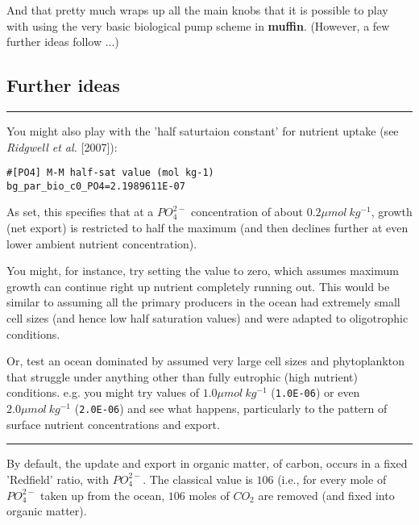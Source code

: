 \documentclass[11pt,fleqn]{book} %
\begin{document}
\vspace{1mm}
And that pretty much wraps up all the main knobs that it is possible to play with using the very basic biological pump scheme in \textbf{muffin}. (However, a few further ideas follow ...)


\subsection{Further ideas}

\vspace{1mm}
\noindent\rule{4cm}{0.5pt}
\vspace{2mm}

\noindent You might also play with the 'half saturtaion constant' for nutrient uptake (see \textit{Ridgwell et al.} [2007]):
\vspace{-1mm}\small\begin{verbatim}
#[PO4] M-M half-sat value (mol kg-1)
bg_par_bio_c0_PO4=2.1989611E-07
\end{verbatim}\normalsize\vspace{-1mm}
As set, this specifies that at a \(PO^{2-}_{4}\) concentration of about \(0.2 \mu mol \:kg^{-1} \), growth (net export) is restricted to half the maximum (and then declines further at even lower ambient nutrient concentration).

You might, for instance, try setting the value to zero, which assumes maximum growth can continue right up nutrient completely running out. This would be similar to assuming all the primary producers in the ocean had extremely small cell sizes (and hence low half saturation values) and were adapted to oligotrophic conditions.

Or, test an ocean dominated by assumed very large cell sizes and phytoplankton that struggle under anything other than fully eutrophic (high nutrient) conditions. e.g. you might try values of \(1.0 \mu mol \:kg^{-1}\) (\texttt{1.0E-06}) or even \(2.0 \mu mol \:kg^{-1}\) (\texttt{2.0E-06}) and see what happens, particularly to the pattern of surface nutrient concentrations and export.

\vspace{1mm}
\noindent\rule{4cm}{0.5pt}
\vspace{2mm}

\noindent By default, the update and export in organic matter, of carbon, occurs in a fixed 'Redfield' ratio, with \(PO^{2-}_{4}\). The classical value is \(106\) (i.e., for every mole of \(PO^{2-}_{4}\) taken up from the ocean, \(106\) moles of \(CO_{2}\) are removed (and fixed into organic matter).
\end{document}
